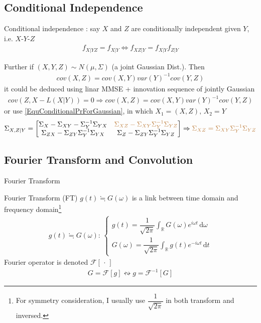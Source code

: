 \subsection{Conditional Independence}
Conditional independence : say $ X $ and $ Z $ are conditionally independent given $ Y $, i.e. $ X $-$ Y $-$ Z $
\begin{align}
    f_{X|YZ}=f_{X|Y}\Leftrightarrow f_{XZ|Y}=f_{X|Y}f_{Z|Y} 
\end{align}

Further if $ (X,Y,Z)\sim N(\mu ,\Sigma ) $ (a joint Gaussian Dist.). Then
\begin{align}
    cov(X,Z)=cov(X,Y)var(Y)^{-1}cov(Y,Z)
\end{align}
it could be deduced using linar MMSE + innovation sequence of jointly Gaussian
\begin{align}
    cov(Z,X-L(X|Y))=0\Rightarrow cov(X,Z)= cov(X,Y)var(Y)^{-1}cov(Y,Z)
\end{align}
or use \autoref{EquConditionalPrForGaussian}, in which $ X_1=(X,Z),\,X_2=Y $
\begin{align}
    \Sigma _{X,Z|Y}=\begin{bmatrix}
        \Sigma _{X}-\Sigma _{XY}-\Sigma _{Y}^{-1}\Sigma _{YX}&\color{brown}\Sigma _{XZ}-\Sigma _{XY}\Sigma _{Y}^{-1}\Sigma _{YZ}\\
        \Sigma _{ZX}-\Sigma _{ZY}\Sigma _Y^{-1}\Sigma _{YX}&\Sigma _{Z}-\Sigma _{ZY}\Sigma _Y^{-1}\Sigma _{YZ}
    \end{bmatrix} \Rightarrow {\color{brown}\Sigma _{XZ}=\Sigma _{XY}\Sigma _{Y}^{-1}\Sigma _{YZ}}
\end{align}



\subsection{Fourier Transform and Convolution}\label{SubSubSectionFourierAndConvolution}
\begin{point}
    Fourier Transform
\end{point}

Fourier Transform (FT) $ g(t)\fallingdotseq G(\omega ) $ is a link between time domain and frequency domain\footnote{For symmetry consideration, I usually use $ \dfrac{1}{\sqrt{2\pi}} $ in both transform and inversed.}
\begin{align}
     g(t)\fallingdotseq G(\omega ):\,\begin{cases}
        g(t)=\dfrac{1}{\sqrt{2\pi}}\int_\mathbb{R}G(\omega )e^{i\omega t}\,\mathrm{d}\omega \\
        G(\omega )=\dfrac{1}{\sqrt{2\pi}}\int _{\mathbb{R}}g(t)e^{-i\omega t} \,\mathrm{d}t
     \end{cases}
\end{align}
Fourier operator is denoted $ \mathscr{F}\left[ \, \cdot \,  \right] $
\begin{align}
    G=\mathscr{F}\left[ g \right] \leftrightsquigarrow g=\mathscr{F}^{-1}\left[ G \right] 
\end{align}

